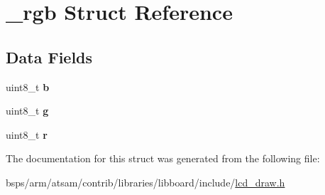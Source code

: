 \hypertarget{struct__rgb}{}\section{\+\_\+rgb Struct Reference}
\label{struct__rgb}
\subsection*{Data Fields}
\begin{DoxyCompactItemize}
\item 
\mbox{\label{struct__rgb_a936712d4cd0fccb6c372287af6521542}} 
uint8\+\_\+t {\bfseries b}
\item 
\mbox{\label{struct__rgb_aea31171ec354f20e4b07552fadeea0d4}} 
uint8\+\_\+t {\bfseries g}
\item 
\mbox{\label{struct__rgb_a3c108e3307135b59849ee04b2876170d}} 
uint8\+\_\+t {\bfseries r}
\end{DoxyCompactItemize}


The documentation for this struct was generated from the following file\+:\begin{DoxyCompactItemize}
\item 
bsps/arm/atsam/contrib/libraries/libboard/include/\mbox{\hyperlink{lcd__draw_8h}{lcd\+\_\+draw.\+h}}\end{DoxyCompactItemize}
